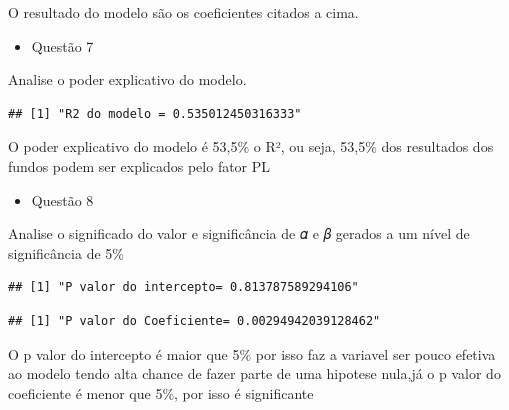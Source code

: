 \documentclass[
]{article}
\newenvironment{Shaded}{\begin{snugshade}}{\end{snugshade}}
\newcommand{\DecValTok}[1]{\textcolor[rgb]{0.00,0.00,0.81}{#1}}
\newcommand{\FunctionTok}[1]{\textcolor[rgb]{0.00,0.00,0.00}{#1}}
\newcommand{\NormalTok}[1]{#1}
\newcommand{\SpecialCharTok}[1]{\textcolor[rgb]{0.00,0.00,0.00}{#1}}
\newcommand{\StringTok}[1]{\textcolor[rgb]{0.31,0.60,0.02}{#1}}
\providecommand{\tightlist}{%
  \setlength{\itemsep}{0pt}\setlength{\parskip}{0pt}}
\begin{document}
O resultado do modelo são os coeficientes citados a cima.

\begin{itemize}
\tightlist
\item
  Questão 7
\end{itemize}

Analise o poder explicativo do modelo.

\begin{verbatim}
## [1] "R2 do modelo = 0.535012450316333"
\end{verbatim}

O poder explicativo do modelo é 53,5\% o R², ou seja, 53,5\% dos
resultados dos fundos podem ser explicados pelo fator PL

\begin{itemize}
\tightlist
\item
  Questão 8
\end{itemize}

Analise o significado do valor e significância de 𝛼 e 𝛽 gerados a um
nível de significância de 5\%

\begin{Shaded}
\end{Shaded}

\begin{verbatim}
## [1] "P valor do intercepto= 0.813787589294106"
\end{verbatim}

\begin{Shaded}
\end{Shaded}

\begin{verbatim}
## [1] "P valor do Coeficiente= 0.00294942039128462"
\end{verbatim}

O p valor do intercepto é maior que 5\% por isso faz a variavel ser
pouco efetiva ao modelo tendo alta chance de fazer parte de uma hipotese
nula,já o p valor do coeficiente é menor que 5\%, por isso é
significante
\end{document}
